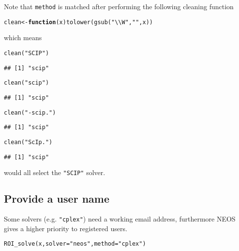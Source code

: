 \documentclass[a4paper]{article}\usepackage[]{graphicx}\usepackage[]{color}
\makeatletter
\newcommand{\hlstr}[1]{\textcolor[rgb]{0.741,0.553,0.545}{#1}}%
\newcommand{\hlstd}[1]{\textcolor[rgb]{0,0,0}{#1}}%
\newcommand{\hlkwa}[1]{\textcolor[rgb]{0.612,0.125,0.933}{\textbf{#1}}}%
\newcommand{\hlkwb}[1]{\textcolor[rgb]{0.125,0.537,0.125}{#1}}%
\newcommand{\hlkwc}[1]{\textcolor[rgb]{0,0,1}{#1}}%
\newcommand{\hlkwd}[1]{\textcolor[rgb]{0,0,0}{#1}}%
\newenvironment{kframe}{%
 \def\at@end@of@kframe{}%
 \ifinner\ifhmode%
  \def\at@end@of@kframe{\end{minipage}}%
  \begin{minipage}{\columnwidth}%
 \fi\fi%
 \def\FrameCommand##1{\hskip\@totalleftmargin \hskip-\fboxsep
 \colorbox{shadecolor}{##1}\hskip-\fboxsep
     \hskip-\linewidth \hskip-\@totalleftmargin \hskip\columnwidth}%
 \MakeFramed {\advance\hsize-\width
   \@totalleftmargin\z@ \linewidth\hsize
   \@setminipage}}%
 {\par\unskip\endMakeFramed%
 \at@end@of@kframe}
\newenvironment{knitrout}{}{} %
\newcommand{\code}[1]{\texttt{#1}}
\makeatother
\begin{document}
Note that \code{method} is matched after performing the following cleaning function
\begin{knitrout}
\color{fgcolor}\begin{kframe}
\begin{alltt}
\hlstd{clean} \hlkwb{<-} \hlkwa{function}\hlstd{(}\hlkwc{x}\hlstd{)} \hlkwd{tolower}\hlstd{(}\hlkwd{gsub}\hlstd{(}\hlstr{"\textbackslash{}\textbackslash{}W"}\hlstd{,} \hlstr{""}\hlstd{, x))}
\end{alltt}
\end{kframe}
\end{knitrout}
which means 
\begin{knitrout}
\color{fgcolor}\begin{kframe}
\begin{alltt}
\hlkwd{clean}\hlstd{(}\hlstr{"SCIP"}\hlstd{)}
\end{alltt}
\begin{verbatim}
## [1] "scip"
\end{verbatim}
\begin{alltt}
\hlkwd{clean}\hlstd{(}\hlstr{"scip"}\hlstd{)}
\end{alltt}
\begin{verbatim}
## [1] "scip"
\end{verbatim}
\begin{alltt}
\hlkwd{clean}\hlstd{(}\hlstr{"-scip."}\hlstd{)}
\end{alltt}
\begin{verbatim}
## [1] "scip"
\end{verbatim}
\begin{alltt}
\hlkwd{clean}\hlstd{(}\hlstr{"ScIp."}\hlstd{)}
\end{alltt}
\begin{verbatim}
## [1] "scip"
\end{verbatim}
\end{kframe}
\end{knitrout}
would all select the \code{"SCIP"} solver.

\subsection{Provide a user name}
Some solvers (e.g. \code{"cplex"}) need a working email address, furthermore
NEOS gives a higher priority to registered users. 

\begin{knitrout}
\color{fgcolor}\begin{kframe}
\begin{alltt}
\hlkwd{ROI_solve}\hlstd{(x,} \hlkwc{solver} \hlstd{=} \hlstr{"neos"}\hlstd{,} \hlkwc{method} \hlstd{=} \hlstr{"cplex"}\hlstd{)}
\end{alltt}


{\ttfamily\noindent\bfseries\color{errorcolor}{\#\# Error in SOLVE(x, cntrl): CPLEX will not run unless you provide a valid email address.}}\end{kframe}
\end{knitrout}
\end{document}
